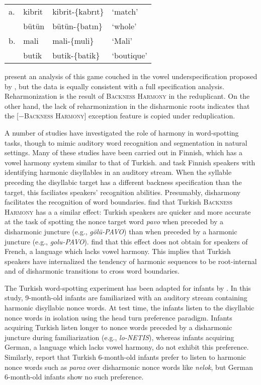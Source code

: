 \begin{example} 
\label{redupgame}
\begin{tabular}{llll}
a. & {kibrit} & {kibrit}-\{{kabrıt}\} & `match'    \\
   & {bütün}  & {bütün}-\{{batın}\}   & `whole'    \\
b. & {mali}   & {mali}-\{{muli}\}     & `Mali'     \\
   & {butik}  & {butik}-\{{batik}\}   & `boutique' \\
\end{tabular}
\end{example}

\noindent 
\citeauthor{Harrison2001} present an analysis of this game couched in the vowel underspecification proposed by \citeauthor{Clements1982}, but the data is equally consistent with a full specification analysis. Reharmonization is the result of \textsc{Backness Harmony} in the reduplicant. On the other hand, the lack of reharmonization in the disharmonic roots indicates that the [$-$\textsc{Backness Harmony}] exception feature is copied under reduplication.

A number of studies have investigated the role of harmony in word-spotting tasks, though to mimic auditory word recognition and segmentation in natural settings. Many of these studies have been carried out in Finnish, which has a vowel harmony system similar to that of Turkish. \citet{Suomi1997} and \citet{Vroomen1998} task Finnish speakers with identifying harmonic disyllables in an auditory stream. When the syllable preceding the disyllabic target has a different backness specification than the target, this faciliates speakers' recognition abilities. Presumably, disharmony facilitates the recognition of word boundaries. \citet{Kabak2010} find that Turkish \textsc{Backness Harmony} has a a similar effect: Turkish speakers are quicker and more accurate at the task of spotting the nonce target word \emph{pavo} when preceded by a disharmonic juncture (e.g., \emph{gölü-PAVO}) than when preceded by a harmonic juncture (e.g., \emph{golu-PAVO}). \citet{Kabak2010} find that this effect does not obtain for speakers of French, a language which lacks vowel harmony. This implies that Turkish speakers have internalized the tendency of harmonic sequences to be root-internal and of disharmonic transitions to cross word boundaries.

The Turkish word-spotting experiment has been adapted for infants by \citet{Kampen2008}. In this study, 9-month-old infants are familiarized with an auditory stream containing harmonic disyllabic nonce words. At test time, the infants listen to the disyllabic nonce words in isolation using the head turn preference paradigm. Infants acquiring Turkish listen longer to nonce words preceded by a disharmonic juncture during familiarization (e.g., \emph{lo-NETIS}), whereas infants acquiring German, a language which lacks vowel harmony, do not exhibit this preference. Similarly, \citeauthor{Kampen2008} report that Turkish 6-month-old infants prefer to listen to harmonic nonce words such as \emph{paroz} over disharmonic nonce words like \emph{nelok}, but German 6-month-old infants show no such preference. 

